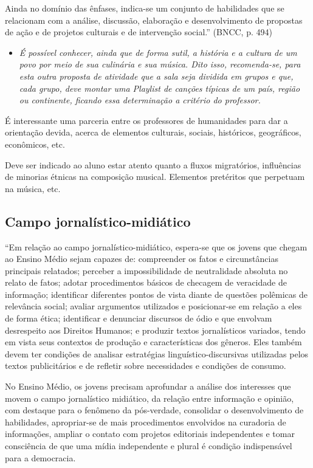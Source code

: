 \documentclass[12pt]{extarticle}
\begin{document}
Ainda no domínio das ênfases, indica-se um conjunto de habilidades que
se relacionam com a análise, discussão, elaboração e desenvolvimento de
propostas de ação e de projetos culturais e de intervenção social.''
(BNCC, p. 494)

\begin{itemize}
\item
  \textit{É possível conhecer, ainda que de forma sutil, a história e a
  cultura de um povo por meio de sua culinária e sua música. Dito isso,
  recomenda-se, para esta outra proposta de atividade que a sala seja
  dividida em grupos e que, cada grupo, deve montar uma Playlist de
  canções típicas de um país, região ou continente, ficando essa
  determinação a critério do professor.}
\end{itemize}

{É interessante uma parceria entre os professores de humanidades
para dar a orientação devida, acerca de elementos culturais, sociais,
históricos, geográficos, econômicos, etc.}

{Deve ser indicado ao aluno estar atento quanto a fluxos
migratórios, influências de minorias étnicas na composição musical.
Elementos pretéritos que perpetuam na música, etc. }

\subsection{Campo jornalístico-midiático}

``Em relação ao campo jornalístico-midiático, espera-se que os jovens
que chegam ao Ensino Médio sejam capazes de: compreender os fatos e
circunstâncias principais relatados; perceber a impossibilidade de
neutralidade absoluta no relato de fatos; adotar procedimentos básicos
de checagem de veracidade de informação; identificar diferentes pontos
de vista diante de questões polêmicas de relevância social; avaliar
argumentos utilizados e posicionar-se em relação a eles de forma ética;
identificar e denunciar discursos de ódio e que envolvam desrespeito aos
Direitos Humanos; e produzir textos jornalísticos variados, tendo em
vista seus contextos de produção e características dos gêneros. Eles
também devem ter condições de analisar estratégias
linguístico-discursivas utilizadas pelos textos publicitários e de
refletir sobre necessidades e condições de consumo.

No Ensino Médio, os jovens precisam aprofundar a análise dos interesses
que movem o campo jornalístico midiático, da relação entre informação e
opinião, com destaque para o fenômeno da pós-verdade, consolidar o
desenvolvimento de habilidades, apropriar-se de mais procedimentos
envolvidos na curadoria de informações, ampliar o contato com projetos
editoriais independentes e tomar consciência de que uma mídia
independente e plural é condição indispensável para a democracia.
\end{document}

